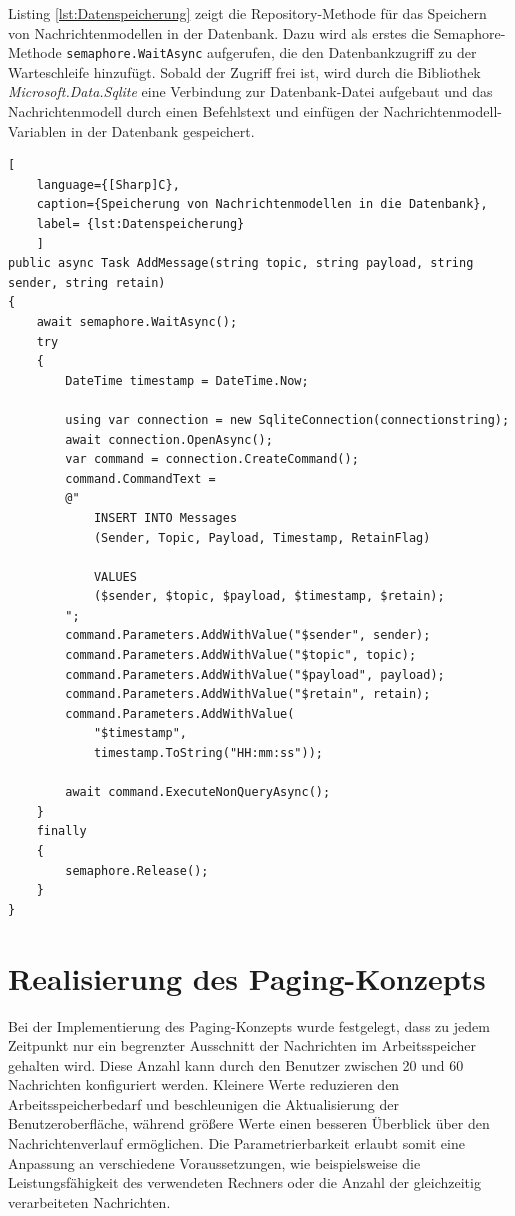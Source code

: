 Listing \ref{lst:Datenspeicherung} zeigt die Repository-Methode für das Speichern von Nachrichtenmodellen in der Datenbank. Dazu wird als erstes die Semaphore-Methode \lstinline{semaphore.WaitAsync} aufgerufen, die den Datenbankzugriff zu der Warteschleife hinzufügt. Sobald der Zugriff frei ist, wird durch die Bibliothek \textit{Microsoft.Data.Sqlite} \autocite{ajcvickersOverviewMicrosoftDataSqlite} eine Verbindung zur Datenbank-Datei aufgebaut und das Nachrichtenmodell durch einen Befehlstext und einfügen der Nachrichtenmodell-Variablen in der Datenbank gespeichert.

\begin{lstlisting}[
    language={[Sharp]C},
    caption={Speicherung von Nachrichtenmodellen in die Datenbank},
    label= {lst:Datenspeicherung}
    ]
public async Task AddMessage(string topic, string payload, string sender, string retain)
{
    await semaphore.WaitAsync();
    try
    {
        DateTime timestamp = DateTime.Now;

        using var connection = new SqliteConnection(connectionstring);
        await connection.OpenAsync();
        var command = connection.CreateCommand();
        command.CommandText =
        @"
            INSERT INTO Messages
            (Sender, Topic, Payload, Timestamp, RetainFlag)

            VALUES
            ($sender, $topic, $payload, $timestamp, $retain);
        ";
        command.Parameters.AddWithValue("$sender", sender);
        command.Parameters.AddWithValue("$topic", topic);
        command.Parameters.AddWithValue("$payload", payload);
        command.Parameters.AddWithValue("$retain", retain);
        command.Parameters.AddWithValue(
            "$timestamp",
            timestamp.ToString("HH:mm:ss"));

        await command.ExecuteNonQueryAsync();
    }
    finally
    {
        semaphore.Release();
    }
}
\end{lstlisting}
\section{Realisierung des Paging-Konzepts}
Bei der Implementierung des Paging-Konzepts wurde festgelegt, dass zu jedem Zeitpunkt nur ein begrenzter Ausschnitt der Nachrichten im Arbeitsspeicher gehalten wird. Diese Anzahl kann durch den Benutzer zwischen 20 und 60 Nachrichten konfiguriert werden. Kleinere Werte reduzieren den Arbeitsspeicherbedarf und beschleunigen die Aktualisierung der Benutzeroberfläche, während größere Werte einen besseren Überblick über den Nachrichtenverlauf ermöglichen. Die Parametrierbarkeit erlaubt somit eine Anpassung an verschiedene Voraussetzungen, wie beispielsweise die Leistungsfähigkeit des verwendeten Rechners oder die Anzahl der gleichzeitig verarbeiteten Nachrichten.

